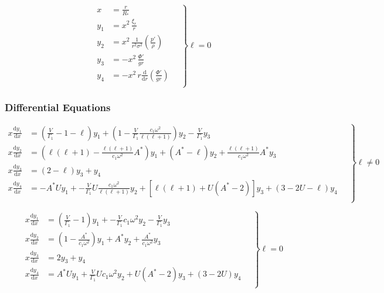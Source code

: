 \documentclass[fleqn]{article}
\newcommand{\diff}{\ensuremath{\mathrm{d}}}
\newcommand{\Vg}{\ensuremath{\frac{V}{\Gamma_{1}}}}
\newcommand{\As}{\ensuremath{A^{\ast}}}
\newcommand{\Rstar}{\ensuremath{R_{\ast}}}
\begin{document}
\begin{equation*}
\left.
\begin{aligned}
x     &= \frac{r}{\Rstar} \\
y_{1} &= x^{2}\, \frac{\xi_{r}}{r} \\
y_{2} &= x^{2}\, \frac{1}{r^{2} \sigma^{2}} \left( \frac{p'}{\rho} \right) \\
y_{3} &= - x^{2}\, \frac{\Phi'}{gr} \\
y_{4} &= - x^{2}\, r \frac{\diff}{\diff r} \left( \frac{\Phi'}{g r} \right) \\
\end{aligned}
\quad \right\} \ell = 0
\end{equation*}

\subsubsection*{Differential Equations}

\begin{equation*}
\left.
\begin{aligned}
x \frac{\diff y_{1}}{\diff x} &=
\left(\Vg - 1 - \ell \right) y_{1} +
\left(1 - \Vg \frac{c_{1} \omega^{2}}{\ell(\ell+1)} \right) y_{2} -
\Vg y_{3} \\
x \frac{\diff y_{2}}{\diff x} &=
\left( \ell(\ell+1) - \frac{\ell(\ell+1)}{c_{1} \omega^{2}} \As \right) y_{1} +
(\As - \ell) y_{2} +
\frac{\ell(\ell+1)}{c_{1} \omega^{2}} \As y_{3} \\
x \frac{\diff y_{3}}{\diff x} &=
(2 - \ell) y_{3} + y_{4} \\
x \frac{\diff y_{4}}{\diff x} &=
- \As U y_{1} +
- \Vg U \frac{c_{1} \omega^{2}}{\ell(\ell+1)} y_{2} +
\left[ \ell(\ell+1) + U(\As - 2) \right] y_{3} +
( 3 - 2U - \ell ) y_{4} \\
\end{aligned}
\quad \right\} \ell \neq 0
\end{equation*}

\begin{equation*}
\left.
\begin{aligned}
x \frac{\diff y_{1}}{\diff x} &=
\left(\Vg - 1 \right) y_{1} +
- \Vg c_{1} \omega^{2} y_{2} -
\Vg y_{3} \\
x \frac{\diff y_{2}}{\diff x} &=
(1 - \frac{\As}{c_{1} \omega^{2}} ) y_{1} +
\As y_{2} +
\frac{\As}{c_{1} \omega^{2}} y_{3} \\
x \frac{\diff y_{3}}{\diff x} &=
2 y_{3} + y_{4} \\
x \frac{\diff y_{4}}{\diff x} &=
\As U y_{1} +
\Vg U c_{1} \omega^{2} y_{2} +
U (\As - 2) y_{3} +
(3 - 2 U) y_{4} \\
\end{aligned}
\quad \right\} \ell = 0
\end{equation*}
\end{document}
